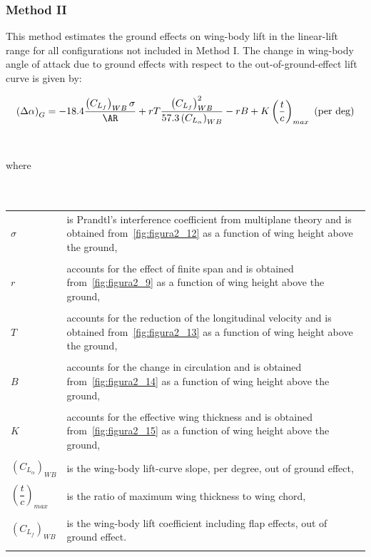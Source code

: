 \subsubsection{Method II}
This method estimates the ground effects on wing-body lift in the linear-lift range for all
configurations not included in Method I.
The change in wing-body angle of attack due to ground
effects with respect to the out-of-ground-effect lift curve is given by:

\begin{equation}
\left(\Delta \alpha\right)_G=-18.4\frac{\left( C_{L_f} \right)_{WB}\sigma}{\AR}+rT\frac{\left( C_{L_f} \right)_{WB}^2}{57.3\left( C_{L_{\alpha}} \right)_{WB}}-rB+K\left(\frac{t}{c}\right)_{max} \ \text{(per  deg)}
\label{eq:equazione2_4} %
\end{equation}
\\ \\   where\\ \\ \\
\begin{tabulary}{1\textwidth}{L L}
\begin{minipage}[T]{6cm}$\sigma$  \end{minipage}& is Prandtl's interference coefficient from multiplane theory and is obtained from~\vref{fig:figura2_12} as a function of wing height above the ground,\\ \\
$r$ & accounts for the effect of finite span and is obtained from~\vref{fig:figura2_9} as a function of wing height above the ground, \\ \\
$T$ & accounts for the reduction of the longitudinal velocity and is obtained from~\vref{fig:figura2_13} as a function of wing height above the ground, \\ \\
$B$ &accounts for the change in circulation and is obtained from~\vref{fig:figura2_14} as a function of wing height above the ground, \\ \\
$K$ & accounts for the effective wing thickness and is obtained from~\vref{fig:figura2_15} as a function of wing height above the ground, \\ \\
$\left(C_{L_{\alpha}} \right)_{WB}$ & is the wing-body lift-curve slope, per degree, out of ground effect, \\ \\
$\left(\dfrac{t}{c}\right)_{max}$  & is the ratio of maximum wing thickness to wing chord, \\ \\
$\left( C_{L_f} \right)_{WB}$ & is the wing-body lift coefficient including flap effects, out of ground effect. \\ \\
\end{tabulary}

